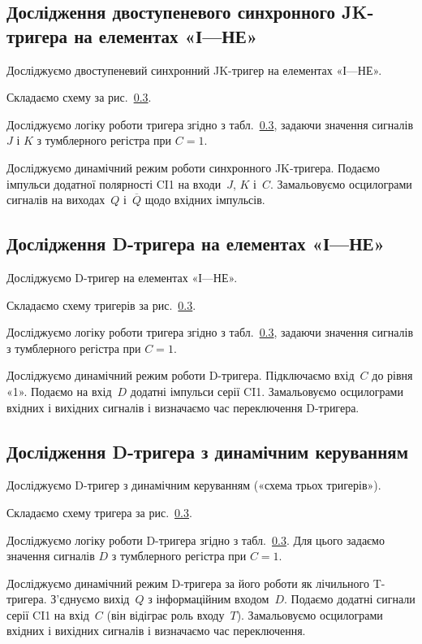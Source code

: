 \documentclass[a4paper,oneside,DIV=10,12pt]{scrartcl}
\newcommand\barneg[1]{\overline{#1}}
\begin{document}
		\subsection{Дослідження двоступеневого синхронного JK-тригера на елементах «І—НЕ»}
			Досліджуємо двоступеневий синхронний JK-тригер на елементах «І—НЕ».
			\begin{steps}
				\item Складаємо схему за рис.~\ref{}.
				
				\item Досліджуємо логіку роботи тригера згідно з табл.~\ref{}, задаючи значення сигналів $J$ і $K$ з тумблерного регістра при $C = 1$.
				
				\item Досліджуємо динамічний режим роботи синхронного JK-тригера. Подаємо імпульси додатної полярності CI1 на входи~$J$, $K$ і~$C$. Замальовуємо осцилограми сигналів на виходах~$Q$ і~$\barneg{Q}$ щодо вхідних імпульсів.
				
			\end{steps}
		
		\subsection{Дослідження D-тригера на елементах «І—НЕ»}
			Досліджуємо D-тригер на елементах «І—НЕ».
			\begin{steps}
				\item Складаємо схему тригерів за рис.~\ref{}.
				
				\item Досліджуємо логіку роботи тригера згідно з табл.~\ref{}, задаючи значення сигналів з тумблерного регістра при $C = 1$.
				
				\item Досліджуємо динамічний режим роботи D-тригера. Підключаємо вхід~$C$ до рівня «1». Подаємо на вхід~$D$ додатні імпульси серії CI1. Замальовуємо осцилограми вхідних і вихідних сигналів і визначаємо час переключення D-тригера.
				
			\end{steps}
		
		
		\subsection{Дослідження D-тригера з динамічним керуванням}
			Досліджуємо D-тригер з динамічним керуванням («схема трьох тригерів»).
			\begin{steps}
				\item Складаємо схему тригера за рис.~\ref{}.
				
				\item Досліджуємо логіку роботи D-тригера згідно з табл.~\ref{}. Для цього задаємо значення сигналів $D$ з тумблерного регістра при $C = 1$.
				
				\item Досліджуємо динамічний режим D-тригера за його роботи як лічильного T-тригера. З'єднуємо вихід~$Q$ з інформаційним входом~$D$. Подаємо додатні сигнали серії CI1 на вхід~$C$ (він відіграє роль входу~$T$). Замальовуємо осцилограми вхідних і вихідних сигналів і визначаємо час переключення.
				
			\end{steps}
			
\end{document}
